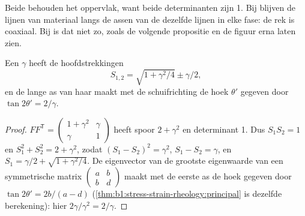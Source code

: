 Beide behouden het oppervlak, want beide determinanten zijn 1. Bij  blijven de lijnen van materiaal langs de assen van de  dezelfde lijnen in elke fase: de rek is coaxiaal. Bij  is dat niet zo, zoals de volgende propositie en de figuur erna laten zien.

\begin{proposition}\label{prop:b1:stress-strain-rheology:simple-shear}
Een  $\gamma$ heeft de hoofdstrekkingen
\[
  S_{1,2} = \sqrt{1 + \gamma^2/4} \pm \gamma/2 ,
\]
en de lange as van haar  maakt met de schuifrichting de hoek $\theta'$ gegeven door $\tan2\theta' = 2/\gamma$.
\end{proposition}

\begin{proof}
$FF^{\mathsf T} = \begin{pmatrix} 1+\gamma^2 & \gamma \\ \gamma & 1\end{pmatrix}$
heeft spoor $2+\gamma^2$ en determinant 1. Dus $S_1S_2 = 1$ en $S_1^2 + S_2^2 = 2 + \gamma^2$, zodat $(S_1 - S_2)^2 = \gamma^2$, $S_1 - S_2 = \gamma$, en $S_1 = \gamma/2 + \sqrt{1+\gamma^2/4}$. De eigenvector van de grootste eigenwaarde van een symmetrische matrix $\begin{pmatrix} a & b \\ b & d\end{pmatrix}$ maakt met de eerste as de hoek gegeven door $\tan2\theta' = 2b/(a-d)$ (\cref{thm:b1:stress-strain-rheology:principal} is dezelfde berekening): hier $2\gamma/\gamma^2 = 2/\gamma$.
\end{proof}

